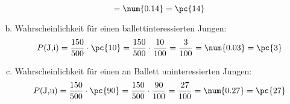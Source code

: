 \begin{exercise}
\begin{enumerate}[a)]
\begin{equation*}
              =\num{0.14}
              =\pc{14}
            \end{equation*}
      \item Wahrscheinlichkeit für einen ballettinteressierten Jungen:
            \begin{equation*}
              P(\text{J,i})
              =\frac{150}{500}\cdot\pc{10}
              =\frac{150}{500}\cdot\frac{10}{100}
              =\frac{3}{100}
              =\num{0.03}
              =\pc{3}
            \end{equation*}
      \item Wahrscheinlichkeit für einen an Ballett uninteressierten Jungen:
            \begin{equation*}
              P(\text{J,u})
              =\frac{150}{500}\cdot\pc{90}
              =\frac{150}{500}\cdot\frac{90}{100}
              =\frac{27}{100}
              =\num{0.27}
              =\pc{27}
            \end{equation*}
    \end{enumerate}
  \fi
\end{exercise}
